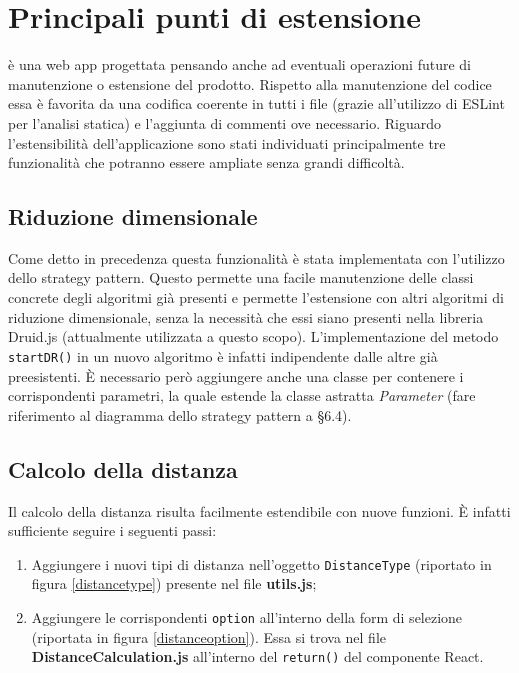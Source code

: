 \section{Principali punti di estensione}
\NomeProgetto{} è una web app progettata pensando anche ad eventuali operazioni future di manutenzione o estensione del prodotto. Rispetto alla manutenzione del codice essa è favorita da una codifica coerente in tutti i file (grazie all'utilizzo di ESLint per l'analisi statica) e l'aggiunta di commenti ove necessario.
Riguardo l'estensibilità dell'applicazione sono stati individuati principalmente tre funzionalità che potranno essere ampliate senza grandi difficoltà.

\subsection{Riduzione dimensionale}
Come detto in precedenza questa funzionalità è stata implementata con l'utilizzo dello strategy pattern. Questo permette una facile manutenzione delle classi concrete degli algoritmi già presenti e permette l'estensione con altri algoritmi di riduzione dimensionale, senza la necessità che essi siano presenti nella libreria Druid.js (attualmente utilizzata a questo scopo). L'implementazione del metodo \texttt{startDR()} in un nuovo algoritmo è infatti indipendente dalle altre già preesistenti. È necessario però aggiungere anche una classe per contenere i corrispondenti parametri, la quale estende la classe astratta \textit{Parameter} (fare riferimento al diagramma dello strategy pattern a \S 6.4).

\subsection{Calcolo della distanza}
Il calcolo della distanza risulta facilmente estendibile con nuove funzioni. È infatti sufficiente seguire i seguenti passi: 
\begin{enumerate}[label=\textbf{\arabic*})]
	\item Aggiungere i nuovi tipi di distanza nell'oggetto \texttt{DistanceType} (riportato in figura \ref{distancetype}) presente nel file \textbf{utils.js};
	\item Aggiungere le corrispondenti \texttt{option} all'interno della form di selezione (riportata in figura \ref{distanceoption}). Essa si trova nel file \textbf{DistanceCalculation.js} all'interno del \texttt{return()} del componente React.
\end{enumerate}

